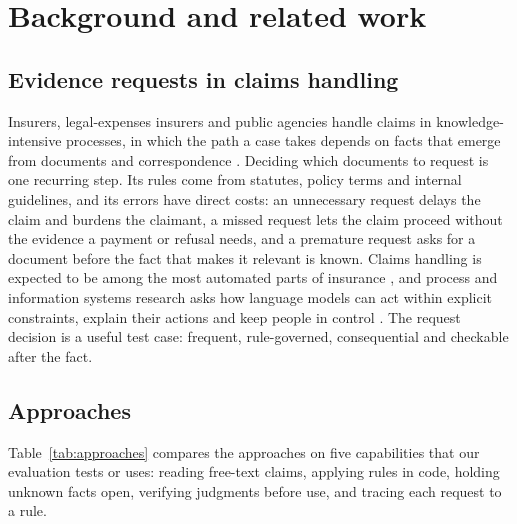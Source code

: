 \section{Background and related work}
\label{sec:related}

\subsection{Evidence requests in claims handling}
\label{sec:context}

Insurers, legal-expenses insurers and public agencies handle claims in knowledge-intensive processes, in which the path a case takes depends on facts that emerge from documents and correspondence \cite{diciccio2015knowledge}. Deciding which documents to request is one recurring step. Its rules come from statutes, policy terms and internal guidelines, and its errors have direct costs: an unnecessary request delays the claim and burdens the claimant, a missed request lets the claim proceed without the evidence a payment or refusal needs, and a premature request asks for a document before the fact that makes it relevant is known. Claims handling is expected to be among the most automated parts of insurance \cite{eling2018impact,eling2022impact}, and process and information systems research asks how language models can act within explicit constraints, explain their actions and keep people in control \cite{dumas2023aiaugmented,vidgof2023large,kampik2025large,chau2025research,hevner2023research}. The request decision is a useful test case: frequent, rule-governed, consequential and checkable after the fact.

\subsection{Approaches}
\label{sec:approaches}

Table~\ref{tab:approaches} compares the approaches on five capabilities that our evaluation tests or uses: reading free-text claims, applying rules in code, holding unknown facts open, verifying judgments before use, and tracing each request to a rule.

